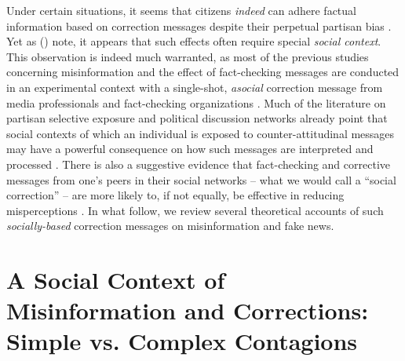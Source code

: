 \documentclass[man, 12pt, a4paper, noextraspace]{apa6}
\begin{document}
  Under certain situations, it seems that citizens \emph{indeed} can adhere factual information based on correction messages despite their perpetual partisan bias \parencite[e.g.,][]{Wood2018, nyhan2017taking}. Yet as \citeauthor{margolin2017} (\citeyear{margolin2017}) note, it appears that such effects often require special \emph{social context}. This observation is indeed much warranted, as most of the previous studies concerning misinformation and the effect of fact-checking messages are conducted in an experimental context with a single-shot, \emph{asocial} correction message from media professionals and fact-checking organizations \parencite[e.g.,][]{nyhan2010corrections,garrett2013undermining,weeks2015emotions}. Much of the literature on partisan selective exposure and political discussion networks already point that social contexts of which an individual is exposed to counter-attitudinal messages may have a powerful consequence on how such messages are interpreted and processed \parencite{messing2014selective, levitan2008resistance}. There is also a suggestive evidence that fact-checking and corrective messages from one's peers in their social networks -- what we would call a \enquote{social correction} -- are more likely to, if not equally, be effective in reducing misperceptions \parencite[e.g.,][]{margolin2017, bode2017see}. In what follow, we review several theoretical accounts of such \emph{socially-based} correction messages on misinformation and fake news.   
      
\section{A Social Context of Misinformation and Corrections: Simple vs. Complex Contagions}
\end{document}
